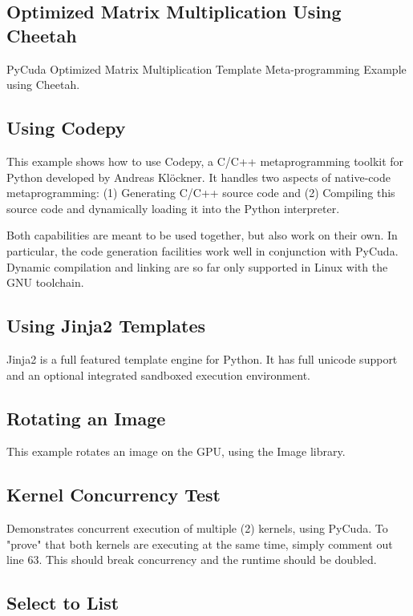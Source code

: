 \documentclass[article,A4,12pt]{llncs}
\begin{document}
\subsection{Optimized Matrix Multiplication Using Cheetah}

PyCuda Optimized Matrix Multiplication 
Template Meta-programming Example using Cheetah.

\subsection{Using Codepy}

This example shows how to use Codepy, a C/C++ metaprogramming toolkit for 
Python developed by Andreas Kl\"ockner. It handles two aspects of native-code 
metaprogramming: (1) Generating C/C++ source code and (2)
Compiling this source code and dynamically loading it into the Python interpreter.

Both capabilities are meant to be used together, but also work on their own. In particular, the code generation facilities work well in conjunction with PyCuda. Dynamic compilation and linking are so far only supported in Linux with the GNU toolchain.

\subsection{Using Jinja2 Templates}

Jinja2 is a full featured template engine for Python. It has full unicode support and
an optional integrated sandboxed execution environment.

\subsection{Rotating an Image}

This example rotates an image on the GPU, using the Image library.

\subsection{Kernel Concurrency Test}

Demonstrates concurrent execution of multiple (2) kernels, using PyCuda. 
To "prove" that both kernels are executing at the same time, simply comment 
out line 63. This should break concurrency and the runtime should be doubled.

\subsection{Select to List}
\end{document}
